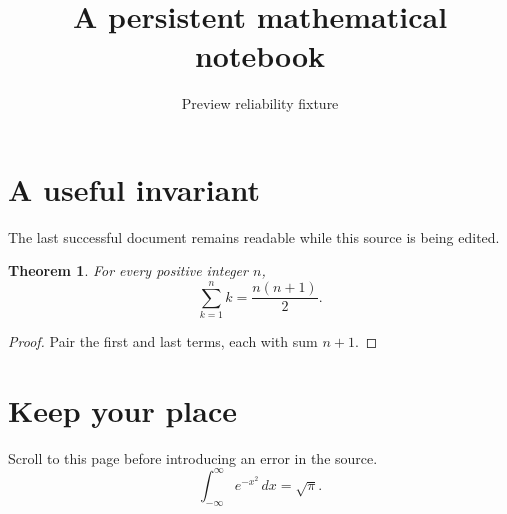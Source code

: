 \documentclass{article}
\title{A persistent mathematical notebook}
\author{Preview reliability fixture}
\newtheorem{theorem}{Theorem}
\begin{document}
\maketitle
\section{A useful invariant}
The last successful document remains readable while this source is being edited.
\begin{theorem}
For every positive integer $n$,
\[\sum_{k=1}^{n} k=\frac{n(n+1)}{2}.\]
\end{theorem}
\begin{proof}
Pair the first and last terms, each with sum $n+1$.
\end{proof}
\newpage
\section{Keep your place}
Scroll to this page before introducing an error in the source.
\[\int_{-\infty}^{\infty}e^{-x^2}\,dx=\sqrt{\pi}.\]
\end{document}
